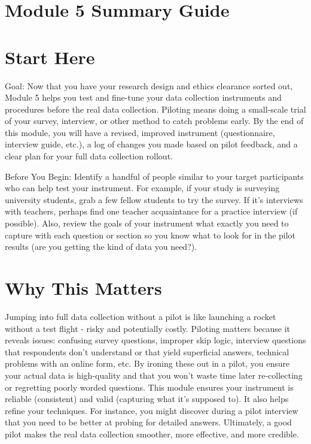 \documentclass[10pt]{article}
\begin{document}
\section*{Module 5 Summary Guide}
\section*{Start Here}
Goal: Now that you have your research design and ethics clearance sorted out, Module 5 helps you test and fine-tune your data collection instruments and procedures before the real data collection. Piloting means doing a small-scale trial of your survey, interview, or other method to catch problems early. By the end of this module, you will have a revised, improved instrument (questionnaire, interview guide, etc.), a log of changes you made based on pilot feedback, and a clear plan for your full data collection rollout.

Before You Begin: Identify a handful of people similar to your target participants who can help test your instrument. For example, if your study is surveying university students, grab a few fellow students to try the survey. If it's interviews with teachers, perhaps find one teacher acquaintance for a practice interview (if possible). Also, review the goals of your instrument what exactly you need to capture with each question or section so you know what to look for in the pilot results (are you getting the kind of data you need?).

\section*{Why This Matters}
Jumping into full data collection without a pilot is like launching a rocket without a test flight - risky and potentially costly. Piloting matters because it reveals issues: confusing survey questions, improper skip logic, interview questions that respondents don't understand or that yield superficial answers, technical problems with an online form, etc. By ironing these out in a pilot, you ensure your actual data is high-quality and that you won't waste time later re-collecting or regretting poorly worded questions. This module ensures your instrument is reliable (consistent) and valid (capturing what it's supposed to). It also helps refine your techniques. For instance, you might discover during a pilot interview that you need to be better at probing for detailed answers. Ultimately, a good pilot makes the real data collection smoother, more effective, and more credible.
\end{document}
